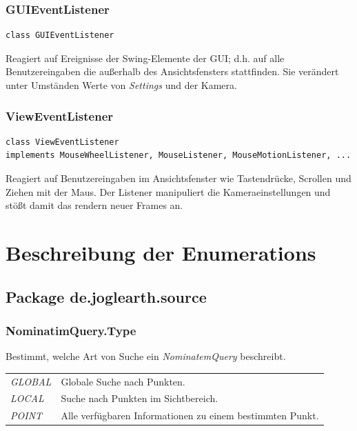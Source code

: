\documentclass[10pt]{scrreprt}
\begin{document}
\vspace{5mm}
\subsection*{GUIEventListener}
\begin{lstlisting}
class GUIEventListener
\end{lstlisting}
Reagiert auf Ereignisse der Swing-Elemente der GUI; d.h. auf alle Benutzereingaben die außerhalb des Ansichtsfensters stattfinden. Sie verändert unter Umständen Werte von \textit{Settings} und der Kamera.\\

\pagebreak

\subsection*{ViewEventListener}
\begin{lstlisting}
class ViewEventListener
implements MouseWheelListener, MouseListener, MouseMotionListener, ...
\end{lstlisting}
Reagiert auf Benutzereingaben im Ansichtsfenster wie Tastendrücke, Scrollen und Ziehen mit der Maus. Der Listener manipuliert die Kameraeinstellungen und stößt damit das rendern neuer Frames an.



\chapter{Beschreibung der Enumerations}
\section*{Package de.joglearth.source}

\subsection*{NominatimQuery.Type}
Bestimmt, welche Art von Suche ein \textit{NominatemQuery} beschreibt.\\[3mm]
\begin{tabular}{p{4cm} p{11cm}}
\textit{GLOBAL} & Globale Suche nach Punkten. \\
\textit{LOCAL} & Suche nach Punkten im Sichtbereich. \\
\textit{POINT} & Alle verfügbaren Informationen zu einem bestimmten Punkt. \\
\end{tabular}
\end{document}
